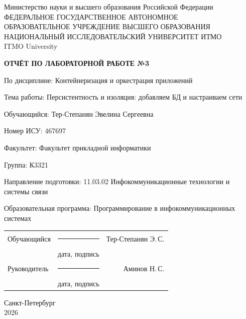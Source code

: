\documentclass[14pt,a4paper,oneside]{extreport}
\newcommand{\LabNumber}{3}
\newcommand{\LabTitle}{Персистентность и изоляция: добавляем БД и настраиваем сети}
\newcommand{\CourseName}{Контейнеризация и оркестрация приложений}
\newcommand{\StudentName}{Тер-Степанян Эвелина Сергеевна}
\newcommand{\StudentShortName}{Тер-Степанян Э.\,С.}
\newcommand{\StudentISU}{467697}
\newcommand{\StudentGroup}{К3321}
\newcommand{\FacultyName}{Факультет прикладной информатики}
\newcommand{\DegreeProgramme}{11.03.02 Инфокоммуникационные технологии и системы связи}
\newcommand{\EducationProgramme}{Программирование в инфокоммуникационных системах}
\newcommand{\TeacherName}{Аминов Н.\,С.}
\newcommand{\ReportCity}{Санкт-Петербург}
\newcommand{\ReportYear}{2026}
\begin{document}
\begin{titlepage}
  \thispagestyle{empty}
  \begin{center}
    \fontsize{12pt}{16pt}\selectfont
    Министерство науки и высшего образования Российской Федерации\\[0.25\baselineskip]
    ФЕДЕРАЛЬНОЕ ГОСУДАРСТВЕННОЕ АВТОНОМНОЕ\\
    ОБРАЗОВАТЕЛЬНОЕ УЧРЕЖДЕНИЕ ВЫСШЕГО ОБРАЗОВАНИЯ\\[0.25\baselineskip]
    НАЦИОНАЛЬНЫЙ ИССЛЕДОВАТЕЛЬСКИЙ УНИВЕРСИТЕТ ИТМО\\
    ITMO University
  \end{center}
  \vspace{0.8\baselineskip}
  \begin{center}
    \textbf{ОТЧЁТ ПО ЛАБОРАТОРНОЙ РАБОТЕ №\LabNumber}
  \end{center}
  \vspace{0.4\baselineskip}
  \begingroup
  \setlength{\parindent}{0pt}
  По дисциплине: \CourseName\par\medskip
  Тема работы: \LabTitle\par\medskip
  Обучающийся: \StudentName\par\medskip
  Номер ИСУ: \StudentISU\par\medskip
  Факультет: \FacultyName\par\medskip
  Группа: \StudentGroup\par\medskip
  Направление подготовки: \DegreeProgramme\par\medskip
  Образовательная программа: \EducationProgramme\par
  \endgroup
  \vfill
  \begin{tabularx}{\textwidth}{@{}l>{\centering\arraybackslash}Xr@{}}
    Обучающийся & \rule{25mm}{0.4pt} & \StudentShortName\\
    & {\fontsize{12pt}{14pt}\selectfont дата, подпись} &\\[0.4\baselineskip]
    Руководитель & \rule{25mm}{0.4pt} & \TeacherName\\
    & {\fontsize{12pt}{14pt}\selectfont дата, подпись} &
  \end{tabularx}
  \vfill
  \begin{center}
    \ReportCity\\
    \ReportYear
  \end{center}
\end{titlepage}
\setcounter{page}{2}
\tableofcontents

\end{document}
